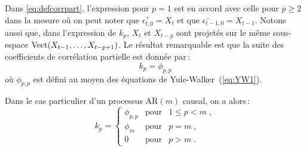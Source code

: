 \begin{remark}
Dans \eqref{eq:defcorrpart}, l'expression pour $p=1$ est en accord
avec celle pour $p\geq 2$ dans la mesure o\`u on peut noter que
$\epsilon_{t,0}^+=X_t$ et que $\epsilon_{t-1,0}^-=X_{t-1}$. Notons
aussi que, dans l'expression de $k_p$, $X_t$ et $X_{t-p}$ sont
projet\'es sur le m\^{e}me sous-espace
$\mathrm{Vect}(X_{t-1},\dots,X_{t-p+1})$. Le r\'esultat remarquable est
que la suite des coefficients de corr\'elation partielle est donn\'ee
par\,:
\begin{equation}
 \label{eq:parcoretcoeffpredic}
  k_p=\phi_{p,p}
\end{equation} o\`u $\phi_{p,p}$ est d\'efini au moyen des \'equations de
Yule-Walker~(\ref{eq:YW1}).
\end{remark}
Dans le cas particulier d'un
processus AR$(m)$ causal, on a alors\,:
$$
 k_p=\left\{
   \begin{matrix}
     \phi_{p,p}&\mbox{pour}& 1\leq p < m\;,\\
     \phi_m&\mbox{pour}& p = m\;,\\
     0&\mbox{pour}& p > m\;.
   \end{matrix}
   \right.
$$


